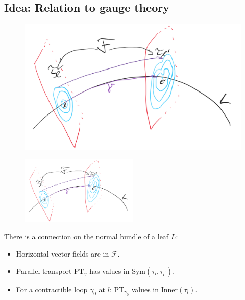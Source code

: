 \documentclass[hyperref={pdfpagelabels=false}]{beamer}
\newcommand\insertreferences{}
\theoremstyle{plain}
\theoremstyle{remark}
\begin{document}
\subsection{Idea: Relation to gauge theory}

\renewcommand\insertreferences{{\tiny Camille Laurent-Gengoux and Leonid Ryvkin, The holonomy of a singular leaf, \newline \textit{Selecta Mathematica 28}, no.\ 2, 45, 2022.}}

\begin{frame}
\begin{figure}[htbp]
	\centering
		\includegraphics[width=1.00\textwidth]{Foliation connection.png}
	\label{fig:Foliationconnection}
\end{figure}

\end{frame}

\begin{frame}
\begin{figure}[htbp]
	\centering
		\includegraphics[width=0.50\textwidth]{Foliation connection.png}
	\label{fig:FoliationconnectionZwei}
\end{figure}

\begin{theorem}
There is a connection on the normal bundle of a leaf $L$:
\begin{itemize}
	\item Horizontal vector fields are in $\mathcal{F}$.
	\item Parallel transport $\mathup{PT}_\gamma$ has values in $\mathup{Sym}(\tau_l, \tau_{l^\prime})$.
	\item For a contractible loop $\gamma_0$ at $l$: $\mathup{PT}_{\gamma_0}$ values in $\mathup{Inner}(\tau_l)$.
\end{itemize}
\end{theorem}

\end{frame}
\end{document}
